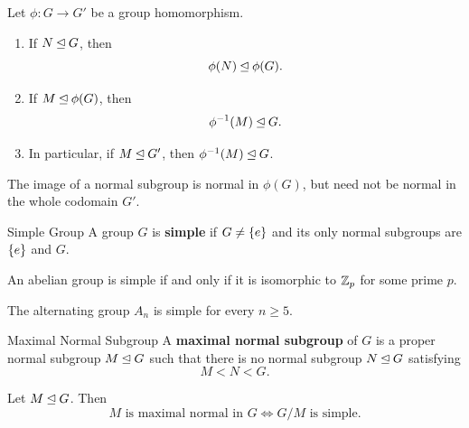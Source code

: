\documentclass[12pt,a4paper]{article}
\begin{document}
    \begin{thm}
        Let $\phi \colon G \to G'$ be a group homomorphism.
        \begin{enumerate}
            \item If $N \unlhd G$, then
            \[
                \phi(N) \unlhd \phi(G).
            \]
            \item If $M \unlhd \phi(G)$, then
            \[
                \phi^{-1}(M) \unlhd G.
            \]
            \item In particular, if $M \unlhd G'$, then
            $\phi^{-1}(M) \unlhd G$.
        \end{enumerate}
    \end{thm}
    \bigskip
    
    \begin{remark}
        The image of a normal subgroup is normal in $\phi(G)$,
        but need not be normal in the whole codomain $G'$.
    \end{remark}
    \bigskip
    
    \begin{defi}{Simple Group}
        A group $G$ is \textbf{simple} if $G \neq \left\{ e \right\}$ and its
        only normal subgroups are $\left\{ e \right\}$ and $G$.
    \end{defi}
    \bigskip
    
    \begin{thm}
        An abelian group is simple if and only if it is isomorphic
        to $\mathbb{Z}_p$ for some prime $p$.
    \end{thm}
    \bigskip
    
    \begin{thm}
        The alternating group $A_n$ is simple for every $n \ge 5$.
    \end{thm}
    \bigskip
    
    \begin{defi}{Maximal Normal Subgroup}
        A \textbf{maximal normal subgroup} of $G$ is a proper normal
        subgroup $M \unlhd G$ such that there is no normal subgroup
        $N \unlhd G$ satisfying
        \[
            M < N < G.
        \]
    \end{defi}
    \bigskip
    
    \begin{thm}
        Let $M \unlhd G$. Then
        \[
            \boxed{
                M \text{ is maximal normal in } G
                \iff G/M \text{ is simple}.
            }
        \]
    \end{thm}
    \bigskip
    
\end{document}
